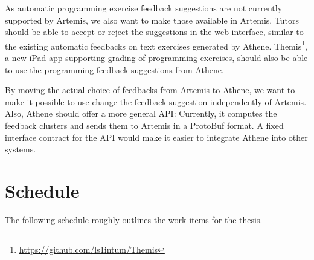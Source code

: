As automatic programming exercise feedback suggestions are not currently supported by Artemis, we also want to make those available in Artemis. Tutors should be able to accept or reject the suggestions in the web interface, similar to the existing automatic feedbacks on text exercises generated by Athene. Themis\footnote{\url{https://github.com/ls1intum/Themis}}, a new iPad app supporting grading of programming exercises, should also be able to use the programming feedback suggestions from Athene.

By moving the actual choice of feedbacks from Artemis to Athene, we want to make it possible to use change the feedback suggestion independently of Artemis. Also, Athene should offer a more general API: Currently, it computes the feedback clusters and sends them to Artemis in a ProtoBuf format. A fixed interface contract for the API would make it easier to integrate Athene into other systems.


\section*{Schedule}

The following schedule roughly outlines the work items for the thesis.

